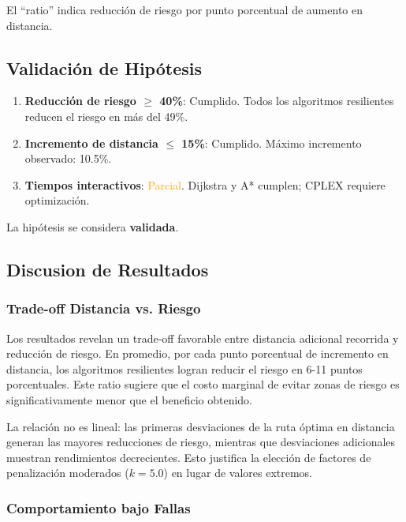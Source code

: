 \documentclass[conference]{IEEEtran}
\begin{document}
El ``ratio'' indica reducción de riesgo por punto porcentual de aumento en distancia.

\subsection{Validación de Hipótesis}

\begin{enumerate}
    \item \textbf{Reducción de riesgo $\geq$ 40\%}: \textcolor{green!60!black}{Cumplido}. Todos los algoritmos resilientes reducen el riesgo en más del 49\%.

    \item \textbf{Incremento de distancia $\leq$ 15\%}: \textcolor{green!60!black}{Cumplido}. Máximo incremento observado: 10.5\%.

    \item \textbf{Tiempos interactivos}: \textcolor{orange}{Parcial}. Dijkstra y A* cumplen; CPLEX requiere optimización.
\end{enumerate}

La hipótesis se considera \textbf{validada}.

\subsection{Discusion de Resultados}

\subsubsection{Trade-off Distancia vs. Riesgo}

Los resultados revelan un trade-off favorable entre distancia adicional recorrida y reducción de riesgo. En promedio, por cada punto porcentual de incremento en distancia, los algoritmos resilientes logran reducir el riesgo en 6-11 puntos porcentuales. Este ratio sugiere que el costo marginal de evitar zonas de riesgo es significativamente menor que el beneficio obtenido.

La relación no es lineal: las primeras desviaciones de la ruta óptima en distancia generan las mayores reducciones de riesgo, mientras que desviaciones adicionales muestran rendimientos decrecientes. Esto justifica la elección de factores de penalización moderados ($k = 5.0$) en lugar de valores extremos.

\subsubsection{Comportamiento bajo Fallas}
\end{document}
